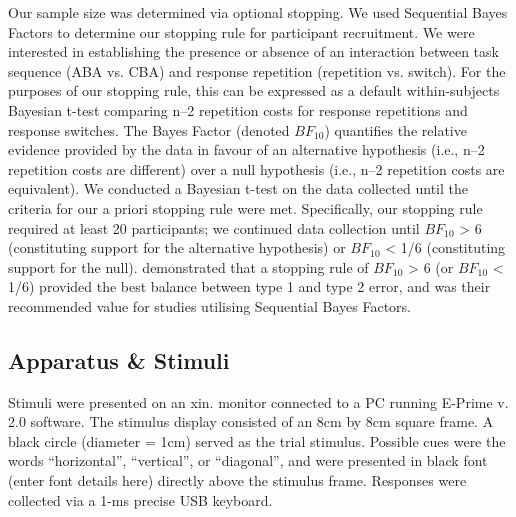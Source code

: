 \documentclass[a4paper, jou, natbib]{apa6}
\begin{document}
Our sample size was determined via optional stopping. We used Sequential Bayes Factors \citep{Schoenbrodtinpress} to determine our stopping rule for participant recruitment. We were interested in establishing the presence or absence of an interaction between task sequence (ABA vs. CBA) and response repetition (repetition vs. switch). For the purposes of our stopping rule, this can be expressed as a default within-subjects Bayesian t-test \citep{Rouder2009} comparing n--2 repetition costs for response repetitions and response switches. The Bayes Factor (denoted $BF_{10}$) quantifies the relative evidence provided by the data in favour of an alternative hypothesis (i.e., n--2 repetition costs are different) over a null hypothesis (i.e., n--2 repetition costs are equivalent). We conducted a Bayesian t-test on the data collected until the criteria for our a priori stopping rule were met. Specifically, our stopping rule required at least 20 participants; we continued data collection until $BF_{10}$ > 6 (constituting support for the alternative hypothesis) or $BF_{10}$ < 1/6 (constituting support for the null). \cite{Schoenbrodtinpress} demonstrated that a stopping rule of $BF_{10}$ > 6 (or $BF_{10}$ < 1/6) provided the best balance between type 1 and type 2 error, and was their recommended value for studies utilising Sequential Bayes Factors. 

\subsection{Apparatus \& Stimuli}
Stimuli were presented on an xin. monitor connected to a PC running E-Prime v. 2.0 software. The stimulus display consisted of an 8cm by 8cm square frame. A black circle (diameter = 1cm) served as the trial stimulus. Possible cues were the words ``horizontal'', ``vertical'', or ``diagonal'', and were presented in black font (enter font details here) directly above the stimulus frame. Responses were collected via a 1-ms precise USB keyboard.
\end{document}
